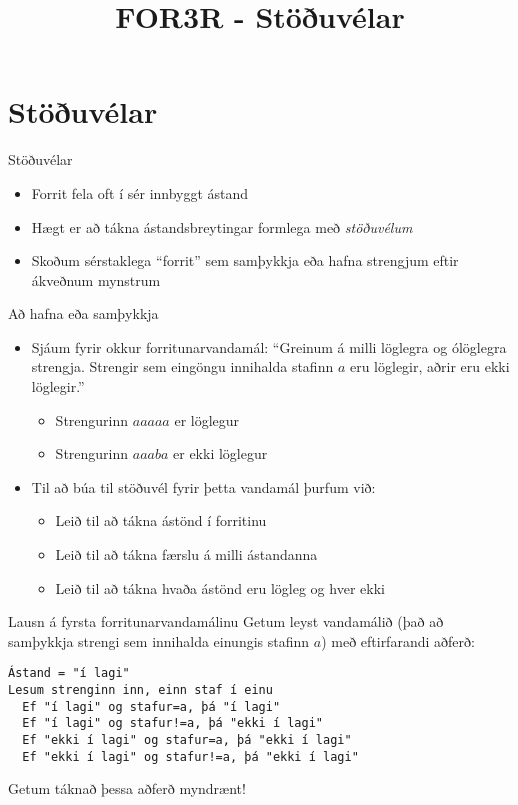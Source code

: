 \documentclass{beamer}
\title{FOR3R - Stöðuvélar}
\begin{document}
\begin{frame}
\titlepage
\end{frame}

\section{Stöðuvélar}

\begin{frame}{Stöðuvélar}
\begin{itemize}
 \item Forrit fela oft í sér innbyggt ástand
 \item Hægt er að tákna ástandsbreytingar formlega með \emph{stöðuvélum}
 \item Skoðum sérstaklega ``forrit'' sem samþykkja eða hafna strengjum eftir ákveðnum mynstrum
\end{itemize}
\end{frame}

\begin{frame}{Að hafna eða samþykkja}
\begin{itemize}
 \item Sjáum fyrir okkur forritunarvandamál: ``Greinum á milli löglegra og ólöglegra strengja. Strengir sem eingöngu innihalda stafinn $a$ eru löglegir, aðrir eru ekki löglegir.''
 \begin{itemize}
  \item Strengurinn $aaaaa$ er löglegur
  \item Strengurinn $aaaba$ er ekki löglegur
 \end{itemize}
 \item Til að búa til stöðuvél fyrir þetta vandamál þurfum við:
 \begin{itemize}
  \item Leið til að tákna ástönd í forritinu
  \item Leið til að tákna færslu á milli ástandanna
  \item Leið til að tákna hvaða ástönd eru lögleg og hver ekki
 \end{itemize}
\end{itemize}
\end{frame}

\begin{frame}[fragile]{Lausn á fyrsta forritunarvandamálinu}
Getum leyst vandamálið (það að samþykkja strengi sem innihalda einungis stafinn $a$) með eftirfarandi aðferð:

\begin{verbatim}
Ástand = "í lagi"
Lesum strenginn inn, einn staf í einu
  Ef "í lagi" og stafur=a, þá "í lagi"
  Ef "í lagi" og stafur!=a, þá "ekki í lagi"
  Ef "ekki í lagi" og stafur=a, þá "ekki í lagi"
  Ef "ekki í lagi" og stafur!=a, þá "ekki í lagi"
\end{verbatim}
Getum táknað þessa aðferð myndrænt!
\end{frame}
\end{document}
